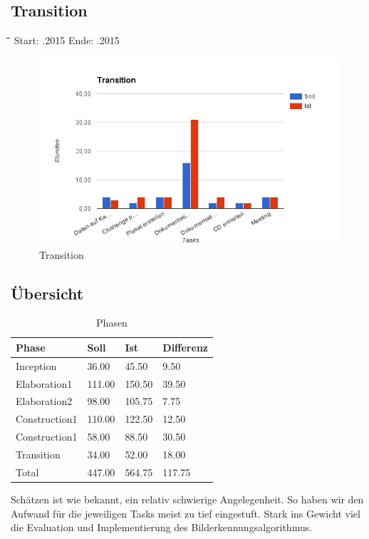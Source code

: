 \subsection{Transition}
\begin{tabbing}[H]
    \hspace*{3cm}\=\hspace*{5cm}\=\hspace*{3cm}\=\hspace*{3cm}\= \kill
    Start: .2015 \> Ende: .2015 \\
\end{tabbing}
\begin{figure}[H]
\centering
\includegraphics[width=390pt]{images/transition.png}
\caption[Transition]{Transition}
\end{figure}

\subsection{Übersicht}
\begin{table}[H]
\centering
    \begin{tabular}{|p{5cm}|p{2cm}|p{2cm}|p{2cm}|}
    \hline    
    \rowcolor{lightblue}
	Phase & Soll & Ist & Differenz \\ \hline
	Inception & 36.00 &	45.50 &	9.50 \\ \hline
	Elaboration1 & 111.00 & 150.50	& 39.50 \\ \hline
	Elaboration2 & 98.00 & 105.75 & 7.75 \\ \hline
	Construction1 & 110.00 & 122.50 & 12.50 \\ \hline
	Construction1 & 58.00 & 88.50 & 30.50 \\ \hline
	Transition & 34.00 & 52.00 & 18.00 \\ \hline
	\rowcolor{lightblue}
	Total & 447.00 & 564.75 & 117.75 \\ \hline
    \end{tabular}
    \caption[Phasen]{Phasen}
\end{table}

Schätzen ist wie bekannt, ein relativ schwierige Angelegenheit. So haben wir den Aufwand für die jeweiligen Tasks meist zu tief eingestuft. Stark ins Gewicht viel die Evaluation und Implementierung des Bilderkennungsalgorithmus.

\newpage